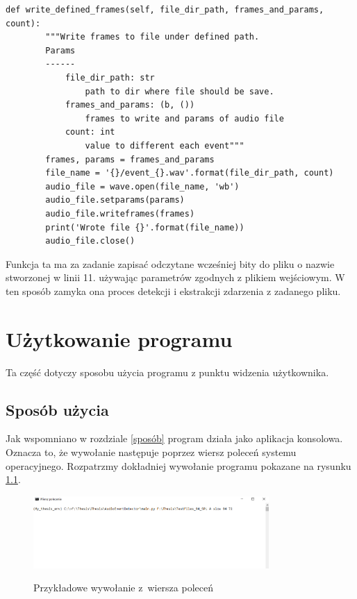 \documentclass[eng,printmode]{mgr}
\begin{document}
\begin{minipage}{\linewidth}
\begin{lstlisting}[caption={Fragment kodu źródłowego pliku WaveReader.py,\newline klasa WaveWriter, metoda write\_defined\_frames },captionpos=b,label={writedefinedframes}] 
    def write_defined_frames(self, file_dir_path, frames_and_params, count):
        """Write frames to file under defined path.
        Params
        ------
            file_dir_path: str
                path to dir where file should be save.
            frames_and_params: (b, ())
                frames to write and params of audio file
            count: int
                value to different each event"""
        frames, params = frames_and_params
        file_name = '{}/event_{}.wav'.format(file_dir_path, count)
        audio_file = wave.open(file_name, 'wb')
        audio_file.setparams(params)
        audio_file.writeframes(frames)
        print('Wrote file {}'.format(file_name))
        audio_file.close()
\end{lstlisting}
\end{minipage}
Funkcja ta ma za zadanie zapisać odczytane wcześniej bity do pliku o nazwie stworzonej w linii 11. używając parametrów zgodnych z plikiem wejściowym. 
W ten sposób zamyka ona proces detekcji i ekstrakcji zdarzenia z zadanego pliku. 


\chapter{Użytkowanie programu} \label{uzytkowanie}
Ta część dotyczy sposobu użycia programu z punktu widzenia użytkownika.
\section{Sposób użycia}
Jak wspomniano w rozdziale \ref{sposób} program działa jako aplikacja konsolowa. Oznacza to, że wywołanie następuje poprzez wiersz poleceń systemu operacyjnego. Rozpatrzmy dokładniej wywołanie programu pokazane na rysunku \ref{cmd}.

\begin{figure}[hbtp]
\caption{Przykładowe wywołanie z~wiersza poleceń}
\centering
\includegraphics[width=0.8\textwidth]{cmd_wywolanie_2.PNG}
\label{cmd}
\end{figure}
\end{document}
